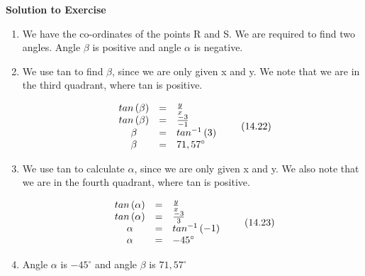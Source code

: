 {\begin{mdframed}[linewidth=4, leftmargin=40, rightmargin=40]
\begin{exercise}
\begin{figure}[H]
\begin{center}
    \vspace{.1in}
    \end{center}
 \end{figure}       
        \par 
        \vspace{5pt}
        \label{m39411*solfhsst!!!underscore!!!id194}\noindent\textbf{Solution to Exercise } \label{m39411*listfhsst!!!underscore!!!id194}\begin{enumerate}[noitemsep, label=\textbf{Step} \textbf{\arabic*}. ] 
            \leftskip=20pt\rightskip=\leftskip\item  
        \label{m39411*id81936}We have the co-ordinates of the points R and S. We are required to find two angles. Angle $\beta $ is positive and angle $\alpha $ is negative.\par 
        \item  
        \label{m39411*id8267}We use tan to find $\beta $, since we are only given x and y. We note that we are in the third quadrant, where tan is positive.\par 
        \label{m39411*id82128}\nopagebreak\noindent{}
    \begin{equation}
    \begin{array}{ccc}\hfill tan\left(\beta \right)& =& \frac{y}{x}\hfill \\ \hfill tan\left(\beta \right)& =& \frac{-3}{-1}\hfill \\ \beta & =& {tan}^{-1}\left(3\right)\hfill \\ \beta & =& 71,{57}^{\circ }\hfill \end{array}\tag{14.22}
      \end{equation}
        \item  
\label{m39411*id9732}We use tan to calculate $\alpha $, since we are only given x and y. We also note that we are in the fourth quadrant, where tan is positive.
\par 
        \label{m39411*id8254}\nopagebreak\noindent{}
    \begin{equation}
    \begin{array}{ccc}\hfill tan\left(\alpha \right)& =& \frac{y}{x}\hfill \\ \hfill tan\left(\alpha \right)& =& \frac{-3}{3}\hfill \\ \alpha & =& {tan}^{-1}\left(-1\right)\hfill \\ \alpha & =& {-45}^{\circ }\hfill \end{array}\tag{14.23}
      \end{equation}
        \item  
        \label{m39411*id827} Angle $\alpha $ is ${-45}^{\circ }$ and angle $\beta $ is $71,{57}^{\circ }$
 \par 
        \end{enumerate}
    \end{exercise}
    \end{mdframed}
    }
